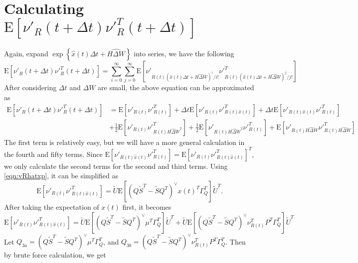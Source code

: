 \documentclass[10pt]{article}
\newcommand{\expect}[1]{\ensuremath{\mathrm{E}\left[ #1 \right]}}
\begin{document}
\section{Calculating $\expect{\nu'_R(t+\Delta t)\nu'^T_R(t+\Delta t)}$}
Again, expand $\exp\left\{ \hat{x}(t)\Delta t + \widehat{H\Delta W} \right\}$ into series, we have the following
\begin{equation}
	\expect{\nu'_R(t+\Delta t)\nu'^T_R(t+\Delta t)} = \sum_{i=0}^\infty\sum_{j=0}^{\infty}\expect{ \nu'_{R(t)\left(\hat{x}(t)\Delta t+\widehat{H\Delta W}\right)^i/i!} \nu'^T_{R(t)\left(\hat{x}(t)\Delta t+\widehat{H\Delta W}\right)^j/j!} }
\end{equation}
After considering $\Delta t$ and $\Delta W$ are small, the above equation can be approximated as
\begin{align}
	\expect{\nu'_R(t+\Delta t)\nu'^T_R(t+\Delta t)} &= \expect{\nu'_{R(t)}\nu'^T_{R(t)}} + \Delta t\expect{\nu'_{R(t)}\nu'^T_{R(t)\hat{x}(t)}} + \Delta t\expect{\nu'_{R(t)\hat{x}(t)}\nu'^T_{R(t)}} \nonumber \\
	&+ \frac{1}{2}\expect{\nu'_{R(t)}\nu'^T_{R(t)\widehat{H\Delta W}^2}} + \frac{1}{2}\expect{\nu'_{R(t)\widehat{H\Delta W}^2}\nu'^T_{R(t)}} + \expect{\nu'_{R(t)\widehat{H\Delta W}}\nu'^T_{R(t)\widehat{H\Delta W}}}
\end{align}
The first term is relatively easy, but we will have a more general calculation in the fourth and fifty terms.
Since $\expect{\nu'_{R(t)\hat{x}(t)}\nu'^T_{R(t)}} = \expect{\nu'_{R(t)}\nu'^T_{R(t)\hat{x}(t)}}^T$, we only calculate the second terms for the second and third terms.
Using \eqref{eqn:vRhatxp}, it can be simplified as
\begin{equation}
	\expect{\nu'_{R(t)}\nu'^T_{R(t)\hat{x}(t)}} = \tilde{U}\expect{(Q\tilde{S}^T-\tilde{S}Q^T)^\vee x(t)^T \Gamma_Q^T}\tilde{U}^T.
\end{equation}
After taking the expectation of $x(t)$ first, it becomes
\begin{equation}
	\expect{\nu'_{R(t)}\nu'^T_{R(t)\hat{x}(t)}} = \tilde{U}\expect{(Q\tilde{S}^T-\tilde{S}Q^T)^\vee \mu^T \Gamma_Q^T}\tilde{U}^T + \tilde{U}\expect{(Q\tilde{S}^T-\tilde{S}Q^T)^\vee \nu_{R(t)}^TP^T \Gamma_Q^T}\tilde{U}^T
\end{equation}
Let $Q_{3a} = (Q\tilde{S}^T-\tilde{S}Q^T)^\vee \mu^T \Gamma_Q^T$, and $Q_{3b} = (Q\tilde{S}^T-\tilde{S}Q^T)^\vee \nu_{R(t)}^TP^T \Gamma_Q^T$.
Then by brute force calculation, we get
\end{document}
